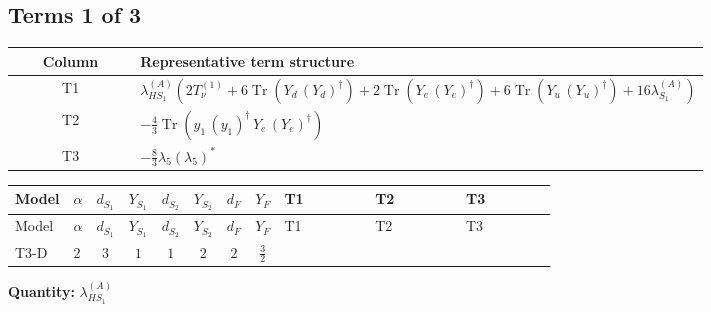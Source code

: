 \documentclass[8pt]{article}
\begin{document}
\begin{landscape}
\subsection*{Terms 1 of 3}
\begin{center}
\begin{tabular}{@{}c >{\raggedright\arraybackslash}p{0.82\linewidth}@{}}
\toprule
Column & Representative term structure \\
\midrule
T1 & \(\displaystyle {\lambda_{HS_1}^{(A)}} (2 T_{\nu}^{(1)}+6 \operatorname{Tr}\!\left({Y_d}\,\left({Y_d}\right)^{\dagger}\right)+2 \operatorname{Tr}\!\left({Y_e}\,\left({Y_e}\right)^{\dagger}\right)+6 \operatorname{Tr}\!\left({Y_u}\,\left({Y_u}\right)^{\dagger}\right)+16 {\lambda_{S_1}^{(A)}})\) \\
\midrule
T2 & \(\displaystyle -\frac{4}{3} \operatorname{Tr}\!\left({y_1}\,\left({y_1}\right)^{\dagger}\,{Y_e}\,\left({Y_e}\right)^{\dagger}\right)\) \\
\midrule
T3 & \(\displaystyle -\frac{8}{3} {\lambda_5} \left({\lambda_5}\right)^{*}\) \\
\midrule
\bottomrule
\end{tabular}
\end{center}
\smallskip
\tiny
\begin{longtable}{@{}llcccccc >{\raggedright\arraybackslash}p{0.21\linewidth} >{\raggedright\arraybackslash}p{0.21\linewidth} >{\raggedright\arraybackslash}p{0.21\linewidth}@{}}
\toprule
Model & $\alpha$ & $d_{S_1}$ & $Y_{S_1}$ & $d_{S_2}$ & $Y_{S_2}$ & $d_F$ & $Y_F$ & T1 & T2 & T3 \\
\midrule
\endfirsthead
\toprule
Model & $\alpha$ & $d_{S_1}$ & $Y_{S_1}$ & $d_{S_2}$ & $Y_{S_2}$ & $d_F$ & $Y_F$ & T1 & T2 & T3 \\
\midrule
\endhead
T3-D & $2$ & $3$ & $1$ & $1$ & $2$ & $2$ & $\frac{3}{2}$ & \scriptsize\adjustbox{max width=\linewidth}{$\begin{gathered} {\lambda_{HS_1}^{(A)}} (2 T_{\nu}^{(1)}+6 \operatorname{Tr}\!\left({Y_d}\,\left({Y_d}\right)^{\dagger}\right)+2 \operatorname{Tr}\!\left({Y_e}\,\left({Y_e}\right)^{\dagger}\right)+6 \operatorname{Tr}\!\left({Y_u}\,\left({Y_u}\right)^{\dagger}\right)+16 {\lambda_{S_1}^{(A)}})\end{gathered}$} & \scriptsize\adjustbox{max width=\linewidth}{$\begin{gathered} -\frac{4}{3} \operatorname{Tr}\!\left({y_1}\,\left({y_1}\right)^{\dagger}\,{Y_e}\,\left({Y_e}\right)^{\dagger}\right)\end{gathered}$} & \scriptsize\adjustbox{max width=\linewidth}{$\begin{gathered} -\frac{8}{3} {\lambda_5} \left({\lambda_5}\right)^{*}\end{gathered}$} \\
\midrule
\bottomrule
\end{longtable}
\clearpage
\noindent\textbf{Quantity: }$\lambda_{HS_1}^{(A)}$\par\smallskip

\end{landscape}
\end{document}
